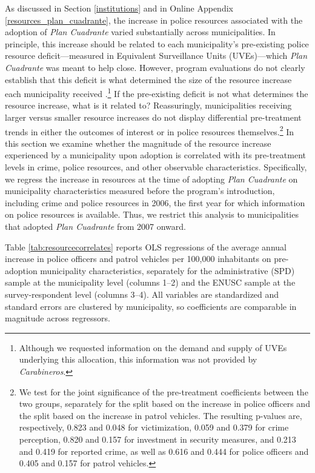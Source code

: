 As discussed in Section \ref{institutions} and in Online Appendix \ref{resources_plan_cuadrante}, the increase in police resources associated with the adoption of \emph{Plan Cuadrante} varied substantially across municipalities. In principle, this increase should be related to each municipality's pre-existing police resource deficit---measured in Equivalent Surveillance Units (UVEs)---which \emph{Plan Cuadrante} was meant to help close. However, program evaluations do not clearly establish that this deficit is what determined the size of the resource increase each municipality received \citep{DIPRES2007_largo,DIPRES2014}.\footnote{Although we requested information on the demand and supply of UVEs underlying this allocation, this information was not provided by \textit{Carabineros}.} If the pre-existing deficit is not what determines the resource increase, what is it related to? Reassuringly, municipalities receiving larger versus smaller resource increases do not display differential pre-treatment trends in either the outcomes of interest or in police resources themselves.\footnote{We test for the joint significance of the pre-treatment coefficients between the two groups, separately for the split based on the increase in police officers and the split based on the increase in patrol vehicles. The resulting p-values are, respectively, 0.823 and 0.048 for victimization, 0.059 and 0.379 for crime perception, 0.820 and 0.157 for investment in security measures, and 0.213 and 0.419 for reported crime, as well as 0.616 and 0.444 for police officers and 0.405 and 0.157 for patrol vehicles.} In this section we examine whether the magnitude of the resource increase experienced by a municipality upon adoption is correlated with its pre-treatment levels in crime, police resources, and other observable characteristics. Specifically, we regress the increase in resources at the time of adopting \emph{Plan Cuadrante} on municipality characteristics measured before the program's introduction, including crime and police resources in 2006, the first year for which information on police resources is available. Thus, we restrict this analysis to municipalities that adopted \emph{Plan Cuadrante} from 2007 onward.

Table \ref{tab:resourcecorrelates} reports OLS regressions of the average annual increase in police officers and patrol vehicles per 100,000 inhabitants on pre-adoption municipality characteristics, separately for the administrative (SPD) sample at the municipality level (columns 1--2) and the ENUSC sample at the survey-respondent level (columns 3--4). All variables are standardized and standard errors are clustered by municipality, so coefficients are comparable in magnitude across regressors.


